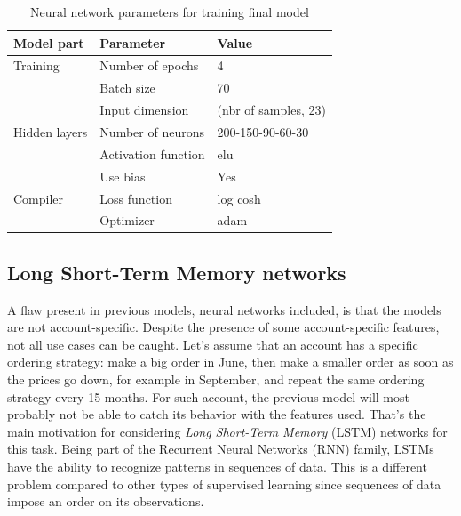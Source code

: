 \begin{table}[h]
    \centering
    \begin{tabular}{l|l|l}
        \textbf{Model part}           & \textbf{Parameter}                 & \textbf{Value}         \\ \hline
        Training                      & Number of epochs                   & 4                     \\
                                      & Batch size                         & 70             \\
                                      & Input dimension                    & (nbr of samples, 23)                     \\ \hline
        Hidden layers                 & Number of neurons                  & 200-150-90-60-30                     \\
                                      & Activation function                & elu                     \\
                                      & Use bias                           & Yes                     \\ \hline
        Compiler                      & Loss function                      & log cosh \\
                                      & Optimizer                          & adam
    \end{tabular}
    \caption{Neural network parameters for training final model}
    \label{tab:nn-final-parameters}
\end{table}


\subsection{Long Short-Term Memory networks}
A flaw present in previous models, neural networks included, is that the models are not account-specific. Despite the presence of some account-specific features, not all use cases can be caught. Let's assume that an account has a specific ordering strategy: make a big order in June, then make a smaller order as soon as the prices go down, for example in September, and repeat the same ordering strategy every 15 months. For such account, the previous model will most probably not be able to catch its behavior with the features used. That's the main motivation for considering \textit{Long Short-Term Memory} (LSTM) networks for this task. Being part of the Recurrent Neural Networks (RNN) family, LSTMs have the ability to recognize patterns in sequences of data. This is a different problem compared to other types of supervised learning since sequences of data impose an order on its observations.

